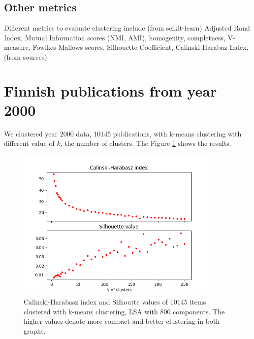 \subsection{Other metrics}
Different metrics to evaluate clustering include (from 
scikit-learn) Adjusted Rand Index, Mutual Information scores 
(NMI, AMI), homogenity, completness, V-measure, Fowlkes-Mallows 
scores, Silhouette Coefficient, Calinski-Harabaz Index, (from 
sources) 


\section{Finnish publications from year 2000}
We clustered year 2000 data, 10145 publications, with k-means 
clustering with different value of $k$, the number of clusters. 
The Figure \ref{fig:ch-silh02} shows the results.
\begin{figure}[ht]
  \begin{center}    
\includegraphics[width=10cm]{images/c-h-silh-index-plot-y2000-2_260-800-kmeans.png}
    \caption{Calinski-Harabasz index and Silhoutte values of 
10145 items clustered with k-means clustering, LSA with 800 
components. The higher values denote more compact and better 
clustering in both graphs.}
    \label{fig:ch-silh02}
  \end{center}
\end{figure}

